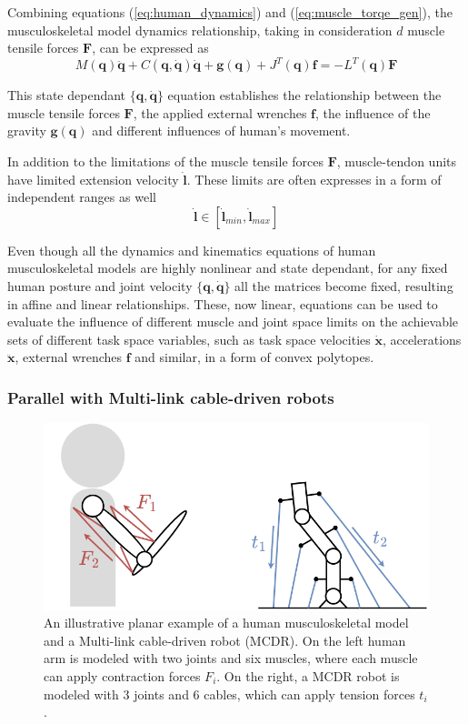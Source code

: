 Combining equations (\ref{eq:human_dynamics}) and (\ref{eq:muscle_torqe_gen}), the musculoskeletal model dynamics relationship, taking in consideration $d$ muscle tensile forces $\bm{F}$, can be expressed as
\begin{equation}
    M(\bm{q})\ddot{\bm{q}} + C(\bm{q},\dot{\bm{q}})\dot{\bm{q}} + \bm{g}(\bm{q}) + J^{T}(\bm{q})\bm{f}  = -L^{T}(\bm{q})\bm{F} 
    \label{eq:human_dyn_all}
\end{equation}

This state dependant $\{\bm{q},\dot{\bm{q}}\}$ equation establishes the relationship between the muscle tensile forces $\bm{F}$, the applied external wrenches $\bm{f}$, the influence of the gravity $\bm{g}(\bm{q})$ and different influences of human's movement. 


In addition to the limitations of the muscle tensile forces $\bm{F}$, muscle-tendon units have limited extension velocity $\dot{\bm{l}}$. These limits are often expresses in a form of independent ranges as well
\begin{equation}
    \dot{\bm{l}} \in  [\dot{\bm{l}}_{min}, \dot{\bm{l}}_{max} ]
    \label{eq:human_vel_lim}
\end{equation}

Even though all the dynamics and kinematics equations of human musculoskeletal models are highly nonlinear and state dependant, for any fixed human posture and joint velocity $\{\bm{q},\dot{\bm{q}}\}$ all the matrices become fixed, resulting in affine and linear relationships. 
These, now linear, equations can be used to evaluate the influence of different muscle and joint space limits on the achievable sets of different task space variables, such as task space velocities $\dot{\bm{x}}$, accelerations $\ddot{\bm{x}}$,  external wrenches $\bm{f}$ and similar, in a form of convex polytopes. 


\subsubsection{Parallel with Multi-link cable-driven robots}
\begin{figure} [!h]
    \centering
    \includegraphics[width=0.45\linewidth]{Chapters/imgs/muscle_mcdrs.png}
    \caption{An illustrative planar example of a human musculoskeletal model and a Multi-link cable-driven robot (MCDR). On the left human arm is modeled with two joints and six muscles, where each muscle can apply contraction forces $F_i$. On the right, a MCDR robot is modeled with 3 joints and 6 cables, which can apply tension forces $t_i$.  }
    \label{fig:muscle_mcdrs}
\end{figure}

